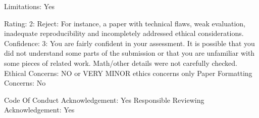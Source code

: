 Limitations:
Yes

Rating: 2: Reject: For instance, a paper with technical flaws, weak evaluation, inadequate reproducibility and incompletely addressed ethical considerations.
Confidence: 3: You are fairly confident in your assessment. It is possible that you did not understand some parts of the submission or that you are unfamiliar with some pieces of related work. Math/other details were not carefully checked.
Ethical Concerns: NO or VERY MINOR ethics concerns only
Paper Formatting Concerns:
No

Code Of Conduct Acknowledgement: Yes
Responsible Reviewing Acknowledgement: Yes